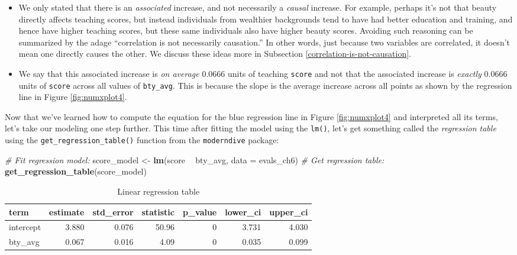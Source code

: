 \documentclass[12pt, krantz2,]{krantz}
\makeatletter
\newenvironment{Shaded}{\begin{snugshade}}{\end{snugshade}}
\newcommand{\CommentTok}[1]{\textcolor[rgb]{0.37,0.37,0.37}{\textit{#1}}}
\newcommand{\DataTypeTok}[1]{\textcolor[rgb]{0.27,0.27,0.27}{#1}}
\newcommand{\KeywordTok}[1]{\textcolor[rgb]{0.27,0.27,0.27}{\textbf{#1}}}
\newcommand{\NormalTok}[1]{#1}
\newcommand{\OperatorTok}[1]{\textcolor[rgb]{0.43,0.43,0.43}{\textbf{#1}}}
\newcommand{\StringTok}[1]{\textcolor[rgb]{0.5,0.5,0.5}{#1}}
\providecommand{\tightlist}{%
  \setlength{\itemsep}{0pt}\setlength{\parskip}{0pt}}
\newenvironment{kframe}{%
\medskip{}
\setlength{\fboxsep}{.8em}
 \def\at@end@of@kframe{}%
 \ifinner\ifhmode%
  \def\at@end@of@kframe{\end{minipage}}%
  \begin{minipage}{\columnwidth}%
 \fi\fi%
 \def\FrameCommand##1{\hskip\@totalleftmargin \hskip-\fboxsep
 \colorbox{shadecolor}{##1}\hskip-\fboxsep
     \hskip-\linewidth \hskip-\@totalleftmargin \hskip\columnwidth}%
 \MakeFramed {\advance\hsize-\width
   \@totalleftmargin\z@ \linewidth\hsize
   \@setminipage}}%
 {\par\unskip\endMakeFramed%
 \at@end@of@kframe}
\renewenvironment{Shaded}{\begin{kframe}}{\end{kframe}}
\makeatother
\begin{document}
\begin{itemize}
\tightlist
\item
  We only stated that there is an \emph{associated} increase, and not necessarily a \emph{causal} increase. For example, perhaps it's not that beauty directly affects teaching scores, but instead individuals from wealthier backgrounds tend to have had better education and training, and hence have higher teaching scores, but these same individuals also have higher beauty scores. Avoiding such reasoning can be summarized by the adage ``correlation is not necessarily causation.'' In other words, just because two variables are correlated, it doesn't mean one directly causes the other. We discuss these ideas more in Subsection \ref{correlation-is-not-causation}.\\
\item
  We say that this associated increase is \emph{on average} 0.0666 units of teaching \texttt{score} and not that the associated increase is \emph{exactly} 0.0666 units of \texttt{score} across all values of \texttt{bty\_avg}. This is because the slope is the average increase across all points as shown by the regression line in Figure \ref{fig:numxplot4}.
\end{itemize}

Now that we've learned how to compute the equation for the blue regression line in Figure \ref{fig:numxplot4} and interpreted all its terms, let's take our modeling one step further. This time after fitting the model using the \texttt{lm()}, let's get something called the \emph{regression table} using the \texttt{get\_regression\_table()} function from the \texttt{moderndive} package:

\begin{Shaded}
\begin{Highlighting}[]
\CommentTok{# Fit regression model:}
\NormalTok{score_model <-}\StringTok{ }\KeywordTok{lm}\NormalTok{(score }\OperatorTok{~}\StringTok{ }\NormalTok{bty_avg, }\DataTypeTok{data =}\NormalTok{ evals_ch6)}
\CommentTok{# Get regression table:}
\KeywordTok{get_regression_table}\NormalTok{(score_model)}
\end{Highlighting}
\end{Shaded}

\begin{table}[H]

\caption{\label{tab:numxplot4b}Linear regression table}
\centering
\fontsize{10}{12}\selectfont
\begin{tabular}{lrrrrrr}
\toprule
term & estimate & std\_error & statistic & p\_value & lower\_ci & upper\_ci\\
\midrule
intercept & 3.880 & 0.076 & 50.96 & 0 & 3.731 & 4.030\\
bty\_avg & 0.067 & 0.016 & 4.09 & 0 & 0.035 & 0.099\\
\bottomrule
\end{tabular}
\end{table}
\end{document}
